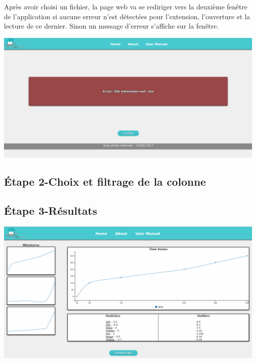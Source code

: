 		Après avoir choisi un fichier, la page web va se rediriger vers la deuxième fenêtre de l'application si aucune erreur n'est détectées pour l'extension, l'ouverture et la lecture de ce dernier. Sinon un message d'erreur s'affiche sur la fenêtre.\\
		
				
	\begin{center}\includegraphics[scale=0.45]{fenetreErreur.png}\end{center}
			
	\subsection{Étape 2-Choix et filtrage de la colonne}
	\subsection{Étape 3-Résultats}
			\begin{center}\includegraphics[scale=0.45]{fenetre3.png}\end{center}
			

